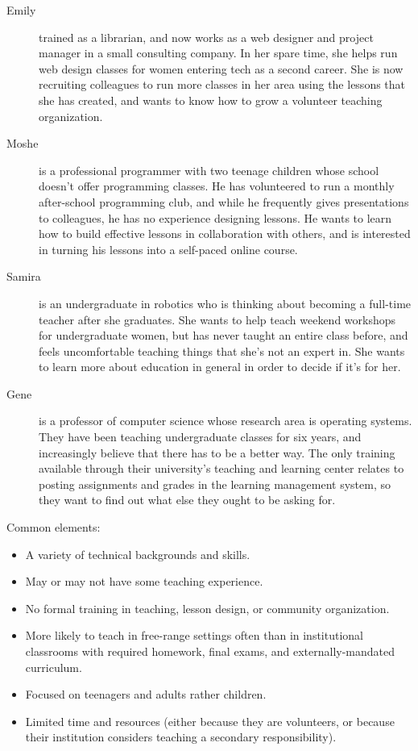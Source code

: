 \begin{description}

  \item[Emily] trained as a librarian, and now works as a web designer
    and project manager in a small consulting company.  In her spare
    time, she helps run web design classes for women entering tech as
    a second career.  She is now recruiting colleagues to run more
    classes in her area using the lessons that she has created, and
    wants to know how to grow a volunteer teaching organization.

  \item[Moshe] is a professional programmer with two teenage children
    whose school doesn't offer programming classes.  He has
    volunteered to run a monthly after-school programming club, and
    while he frequently gives presentations to colleagues, he has no
    experience designing lessons.  He wants to learn how to build
    effective lessons in collaboration with others, and is interested
    in turning his lessons into a self-paced online course.

  \item[Samira] is an undergraduate in robotics who is thinking about
    becoming a full-time teacher after she graduates.  She wants to
    help teach weekend workshops for undergraduate women, but has
    never taught an entire class before, and feels uncomfortable
    teaching things that she's not an expert in.  She wants to learn
    more about education in general in order to decide if it's for
    her.

  \item[Gene] is a professor of computer science whose research area
    is operating systems.  They have been teaching undergraduate
    classes for six years, and increasingly believe that there has to
    be a better way. The only training available through their
    university's teaching and learning center relates to posting
    assignments and grades in the learning management system, so they
    want to find out what else they ought to be asking for.

\end{description}

\noindent
Common elements:

\begin{itemize}
\item
  A variety of technical backgrounds and skills.
\item
  May or may not have some teaching experience.
\item
  No formal training in teaching, lesson design, or community
  organization.
\item
  More likely to teach in free-range settings often than in
  institutional classrooms with required homework, final exams, and
  externally-mandated curriculum.
\item
  Focused on teenagers and adults rather children.
\item
  Limited time and resources (either because they are volunteers,
  or because their institution considers teaching a secondary
  responsibility).
\end{itemize}

